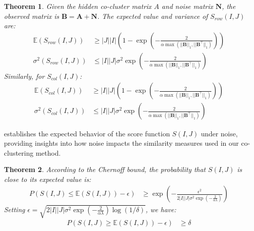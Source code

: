\documentclass[journal]{IEEEtran}
\newtheorem{theorem}{Theorem}
\begin{document}
\begin{theorem}
  \label{thm:expected_score}
  Given the hidden co-cluster matrix $A$ and noise matrix $\mathbf{N}$, the observed matrix is $\mathbf{B} = \mathbf{A} + \mathbf{N}$. The expected value and variance of $S_{row}(I,J)$ are:
  \begin{equation}
    \begin{split}
      \mathbb{E}(S_{row}(I,J)) & \ge |J||I| \left(1 - \exp(-\frac{2}{\alpha \max(||\mathbf{B}||_1, ||\mathbf{B}^\top||_1)}) \right) \\
      \sigma^2(S_{row}(I,J))   & \le |I||J| \sigma^2 \exp(-\frac{2}{\alpha \max(||\mathbf{B}||_1, ||\mathbf{B}^\top||_1)})
    \end{split}
  \end{equation}
  Similarly, for $S_{col}(I,J)$:
  \begin{equation}
    \begin{split}
      \mathbb{E}(S_{col}(I,J)) & \ge |I||J| \left(1 - \exp(-\frac{2}{\alpha \max(||\mathbf{B}||_1, ||\mathbf{B}^\top||_1)}) \right) \\
      \sigma^2(S_{col}(I,J))   & \le |I||J| \sigma^2 \exp(-\frac{2}{\alpha \max(||\mathbf{B}||_1, ||\mathbf{B}^\top||_1)})
    \end{split}
  \end{equation}
\end{theorem}

 establishes the expected behavior of the score function $S(I,J)$ under noise, providing insights into how noise impacts the similarity measures used in our co-clustering method.

\begin{theorem}
  \label{thm:chernoff_bound}
  According to the Chernoff bound, the probability that $S(I,J)$ is close to its expected value is:
  \begin{equation}
    \begin{split}
      P(S(I,J) \le \mathbb{E}(S(I,J)) - \epsilon)
       & \ge \exp(-\frac{\epsilon^2}{2|I||J| \sigma^2 \exp(-\frac{2}{\alpha \lambda})})
    \end{split}
  \end{equation}
  Setting $\epsilon = \sqrt{2|I||J| \sigma^2 \exp(-\frac{2}{\alpha \lambda}) \log(1/\delta)}$, we have:
  \begin{equation}
    \begin{split}
      P(S(I,J) \ge \mathbb{E}(S(I,J)) - \epsilon) & \ge \delta
    \end{split}
  \end{equation}

\end{theorem}
\end{document}
